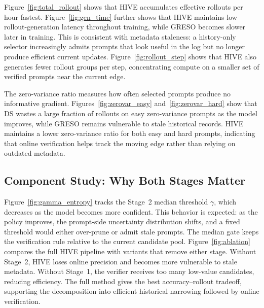 Figure~\ref{fig:total_rollout} shows that HIVE accumulates effective rollouts per hour fastest. Figure~\ref{fig:gen_time} further shows that HIVE maintains low rollout-generation latency throughout training, while GRESO becomes slower later in training. This is consistent with metadata staleness: a history-only selector increasingly admits prompts that look useful in the log but no longer produce efficient current updates. Figure~\ref{fig:rollout_step} shows that HIVE also generates fewer rollout groups per step, concentrating compute on a smaller set of verified prompts near the current edge.

% 
% 

The zero-variance ratio measures how often selected prompts produce no informative gradient. Figures~\ref{fig:zerovar_easy} and~\ref{fig:zerovar_hard} show that DS wastes a large fraction of rollouts on easy zero-variance prompts as the model improves, while GRESO remains vulnerable to stale historical records. HIVE maintains a lower zero-variance ratio for both easy and hard prompts, indicating that online verification helps track the moving edge rather than relying on outdated metadata.

\subsection{Component Study: Why Both Stages Matter}
\label{subsec:exp-component-study}

Figure~\ref{fig:gamma_entropy} tracks the Stage~2 median threshold $\gamma$, which decreases as the model becomes more confident. This behavior is expected: as the policy improves, the prompt-side uncertainty distribution shifts, and a fixed threshold would either over-prune or admit stale prompts. The median gate keeps the verification rule relative to the current candidate pool. 
Figure~\ref{fig:ablation} compares the full HIVE pipeline with variants that remove either stage. Without Stage~2, HIVE loses online precision and becomes more vulnerable to stale metadata. Without Stage~1, the verifier receives too many low-value candidates, reducing efficiency. The full method gives the best accuracy--rollout tradeoff, supporting the decomposition into efficient historical narrowing followed by online verification.
